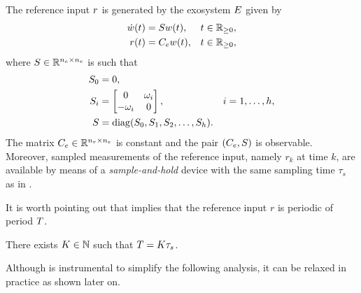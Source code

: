 \begin{assumption}
  \label{ass:sdall_exo}
  The reference input $r$ is generated by the exosystem $E$ given by
  \begin{subequations}
    \label{eq:sdall_ctexo}
    \begin{align}
      \dot{w}(t) &= Sw(t), & t\in\mathbb{R}_{\geq 0},\\
      r(t) &= C_ew(t), & t\in\mathbb{R}_{\geq 0},
    \end{align}
  \end{subequations}
  where $S\in\mathbb{R}^{{n_e}\times{n_e}}$ is such that
  \begin{subequations}
    \label{eq:sdall_exoblocks}
    \begin{align}
      S_0 &= 0,\\
      S_i &= \begin{bmatrix}0 & \omega_i \\ -\omega_i & 0\end{bmatrix}, & i=1,\dotsc,h,\\
      S &= \operatorname{diag}(S_0,S_1,S_2,\dotsc,S_h).
    \end{align}
  \end{subequations}
  The matrix $C_e\in\mathbb{R}^{{n_r}\times{n_e}}$ is constant and the pair $(C_e,S)$ is observable. Moreover, sampled measurements of the reference input, namely $r_k$ at time $k$, are available by means of a \emph{sample-and-hold} device with the same sampling time $\tau_s$ as in .\closestatement
\end{assumption}
It is worth pointing out that  implies that the reference input $r$ is periodic of period $T$.
\begin{assumption}
  \label{ass:sdall_periods}
  There exists $K\in\mathbb{N}$ such that $T = K\tau_s$.\closestatement
\end{assumption}
Although  is instrumental to simplify the following analysis, it can be relaxed in practice as shown later on.

